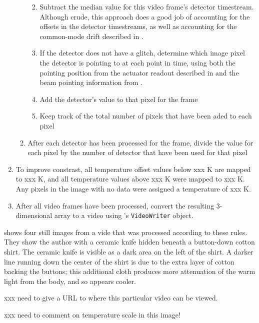 \begin{enumerate}
\begin{enumerate}
\begin{enumerate}
\begin{enumerate}
      \end{enumerate}
    \item Subtract the median value for this video frame's detector timestream.
          Although crude, this approach does a good job of accounting for the offsets in the detector timestreams, as well as accounting for the common-mode drift described in .
    \item If the detector does not have a glitch, determine which image pixel the detector is pointing to at each point in time, using both the pointing position from the actuator readout described in  and the beam pointing information from .
    \item Add the detector's value to that pixel for the frame
    \item Keep track of the total number of pixels that have been aded to each pixel
    \end{enumerate}
  \item After each detector has been processed for the frame, divide the value for each pixel by the number of detector that have been used for that pixel
  \end{enumerate}
  \item To improve constrast, all temperature offset values below xxx K are mapped to xxx K, and all temperature values above xxx K were mapped to xxx K.
        Any pixels in the image with no data were assigned a temperature of xxx K.
  \item After all video frames have been processed, convert the resulting 3-dimensional array to a video using \MATLAB's \texttt{VideoWriter} object.
\end{enumerate}

 shows four still images from a vide that was processed according to these rules.
They show the author with a ceramic knife hidden beneath a button-down cotton shirt.
The ceramic knife is visible as a dark area on the left of the shirt.
A darker line running down the center of the shirt is due to the extra layer of cotton backing the buttons; this additional cloth produces more attenuation of the warm light from the body, and so appears cooler.

xxx need to give a URL to where this particular video can be viewed.

xxx need to comment on temperature scale in this image!

